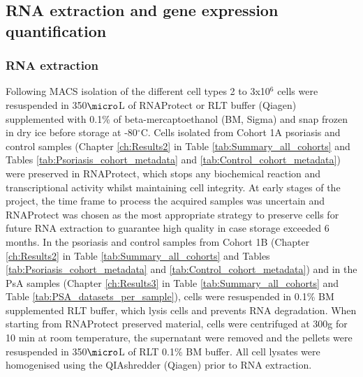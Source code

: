 

\subsection{RNA extraction and gene expression quantification}

\subsubsection{RNA extraction}
Following MACS isolation of the different cell types 2 to 3x10$^6$ cells were resuspended in 350$\micro$L of RNAProtect or RLT buffer (Qiagen) supplemented with 0.1\% of beta-mercaptoethanol (BM, Sigma) and snap frozen in dry ice before storage at -80{$^\circ$}C. Cells isolated from Cohort 1A psoriasis and control samples (Chapter \ref{ch:Results2} in Table \ref{tab:Summary_all_cohorts} and Tables \ref{tab:Psoriasis_cohort_metadata} and \ref{tab:Control_cohort_metadata}) were preserved in RNAProtect, which stops any biochemical reaction and transcriptional activity whilst maintaining cell integrity. At early stages of the project, the time frame to process the acquired samples was uncertain and RNAProtect was chosen as the most appropriate strategy to preserve cells for future RNA extraction to guarantee high quality in case storage exceeded 6 months. In the psoriasis and control samples from Cohort 1B (Chapter \ref{ch:Results2} in Table \ref{tab:Summary_all_cohorts} and Tables \ref{tab:Psoriasis_cohort_metadata} and \ref{tab:Control_cohort_metadata}) and in the PsA samples (Chapter \ref{ch:Results3} in Table \ref{tab:Summary_all_cohorts} and Table \ref{tab:PSA_datasets_per_sample}), cells were resuspended in 0.1\% BM supplemented RLT buffer, which lysis cells and prevents RNA degradation. When starting from RNAProtect preserved material, cells were centrifuged at 300g for 10 min at room temperature, the supernatant were removed and the pellets were resuspended in 350$\micro$L of RLT 0.1\% BM buffer. All cell lysates were homogenised using the QIAshredder (Qiagen) prior to RNA extraction.

